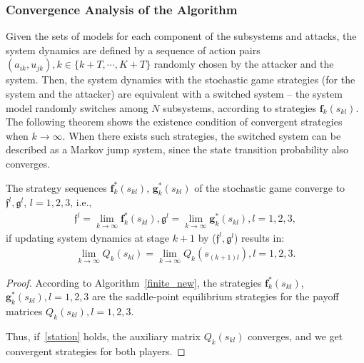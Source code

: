 \subsubsection{Convergence Analysis of the Algorithm}
\label{coverge}
Given the sets of models for each component of the subsystems and attacks, the system dynamics are defined by a sequence of action pairs $(a_{ik},u_{jk}), k \in \{k+T, \cdots, K+T\}$ randomly chosen by the attacker and the system. 
Then, the system dynamics with the stochastic game strategies (for the system and the attacker) are equivalent with a switched system -- the system model randomly switches among $N$ subsystems, according to strategies $\mathbf{f}_k(s_{kl})$. %
The following theorem shows the existence condition of convergent strategies when $k\to \infty$. 
When there exists such strategies, the switched system can be described as a Markov jump system, since the state transition probability also converges. 
\begin{proposition}
The strategy sequences $\mathbf{f}_k^*(s_{kl})$, $\mathbf{g}_k^*(s_{kl})$ of the stochastic game converge to $\mathfrak{f}^l,\mathfrak{g}^l $, $l=1,2,3$, i.e.,
\begin{align*}
\mathfrak{f}^l=\lim\limits_{k\to\infty}\mathbf{f}_k^*(s_{kl}), \mathfrak{g}^l=\lim\limits_{k\to\infty}\mathbf{g}_k^*(s_{kl}), l=1,2,3,
\end{align*}
if updating system dynamics at stage $k+1$ by ($\mathfrak{f}^l,\mathfrak{g}^l$) results in:
\begin{align}
\lim \limits_{k \to \infty} Q_{k}(s_{kl})=\lim \limits_{k \to \infty} Q_{k}(s_{(k+1)l}), l=1,2,3.
\label{station}
\end{align}
\end{proposition}
\begin{proof}
According to Algorithm~\ref{finite_new}, the strategies $\mathbf{f}^*_k(s_{kl})$, $\mathbf{g}^*_k(s_{kl}),l=1,2,3$ are the saddle-point equilibrium strategies for the payoff matrices $Q_{k}(s_{kl}),l=1,2,3$. 
\iffalse After calculating the strategies at stage $k$, the next step of the Algorithm~\ref{finite_new} is updating the system dynamics, and then getting the auxiliary matrices $Q_{k}(s_{(k+1)l}),l=1,2,3$ for stage $k+1$. 
The saddle-point equilibrium strategies at stage $k+1$ are decided by $Q_{k}(s_{(k+1)l}),l=1,2,3$. 
Thus, if updating the system dynamics for the auxiliary matrix $Q_{k}(s_{kl})$ and at each mode $Q_{k}(s_{kl})$  converges with an optimal strategy for both players, \fi
Thus, if~\eqref{station} holds, the auxiliary matrix $Q_{k}(s_{kl})$ converges, and we get convergent strategies for both players. 
\end{proof}
